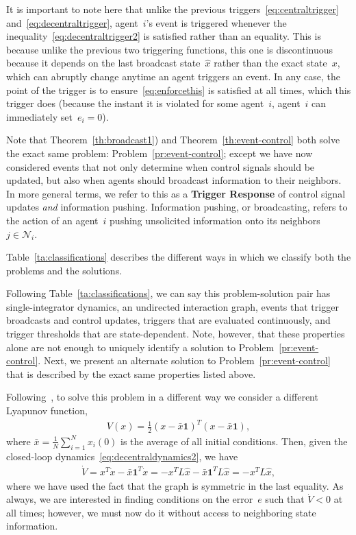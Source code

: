 \documentclass{autart}
\newcommand{\NN}{{\mathcal{N}}}
\renewcommand{\hat}{\widehat}
\begin{document}
It is important to note here that unlike the previous
triggers~\eqref{eq:centraltrigger} and~\eqref{eq:decentraltrigger},
agent~$i$'s event is triggered whenever the
inequality~\eqref{eq:decentraltrigger2} is satisfied rather than an
equality. This is because unlike the previous two triggering
functions, this one is discontinuous because it depends on the last
broadcast state~$\hat{x}$ rather than the exact state~$x$, which can
abruptly change anytime an agent triggers an event. In any case, the
point of the trigger is to ensure~\eqref{eq:enforcethis} is satisfied
at all times, which this trigger does (because the instant it is
violated for some agent~$i$, agent~$i$ can immediately set~$e_i = 0$).

Note that Theorem~\ref{th:broadcast1}) and
Theorem~\ref{th:event-control} both solve the exact same problem:
Problem~\ref{pr:event-control}; except we have now considered events
that not only determine when control signals should be updated, but
also when agents should broadcast information to their neighbors. In
more general terms, we refer to this as a \textbf{Trigger Response} of
control signal updates \emph{and} information pushing. Information
pushing, or broadcasting, refers to the action of an agent~$i$ pushing
unsolicited information onto its neighbors~$j \in
\NN_i$. {Table~\ref{ta:classifications} describes the different ways in
which we classify both the problems and the solutions.

Following Table~\ref{ta:classifications}, we can say this
problem-solution pair has single-integrator dynamics, an undirected
interaction graph, events that trigger broadcasts and control updates,
triggers that are evaluated continuously, and trigger thresholds that
are state-dependent. Note, however, that these properties alone are
not enough to uniquely identify a solution to
Problem~\ref{pr:event-control}. Next, we present an alternate solution
to Problem~\ref{pr:event-control} that is described by the exact same
properties listed above.}

Following~\cite{CN-JC:16-auto}, to solve this problem in a different
way we consider a different Lyapunov function,
\begin{align}\label{eq:otherlyap}
  V(x) = \frac{1}{2} (x - \bar{x} \mathbf{1})^T (x - \bar{x}
  \mathbf{1}) ,
\end{align}
where $\bar{x} = \frac{1}{N} \sum_{i=1}^N x_i(0)$ is the average of
all initial conditions.  Then, given the closed-loop
dynamics~\eqref{eq:decentraldynamics2}, we have
\begin{align*}
  \dot{V} = x^T \dot{x} - \bar{x} \mathbf{1}^T \dot{x} = - x^T L
  \hat{x} - \bar{x} \mathbf{1}^T L \hat{x} = - x^T L \hat{x},
\end{align*}
where we have used the fact that the graph is symmetric in the last
equality.  As always, we are interested in finding conditions on the
error~$e$ such that $\dot{V} < 0$ at all times; however, we must now
do it without access to neighboring state information.
\end{document}
